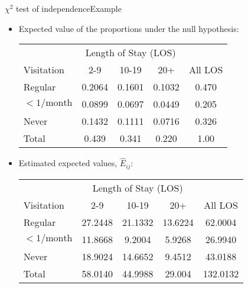 \documentclass[xcolor=dvipsnames]{beamer}
\begin{document}
\begin{frame}{$\chi^2$ test of independence}{Example}
\begin{itemize}
	\item Expected value of the proportions under the null hypothesis:
	\vspace{1mm}
	{\scriptsize
		\begin{center}
		\begin{tabular}{|l|ccc|c|}
			\hline
			& \multicolumn{3}{c|}{Length of Stay (LOS)} & \\
			Visitation & 2-9 & 10-19 & 20+ & All LOS \\ \hline
			Regular           &0.2064 &0.1601 &0.1032 & 0.470\\
			$<1/\text{month}$ &0.0899 &0.0697 &0.0449 & 0.205\\
			Never             &0.1432 &0.1111 &0.0716 & 0.326\\ \hline
			Total & 0.439 & 0.341 & 0.220 &1.00 \\ \hline
		\end{tabular}
	\end{center}}
	\vspace{1mm}
	\item Estimated expected values, $\hat{E}_{ij}$:
	\vspace{1mm}
	{\scriptsize
		\begin{center}
			\begin{tabular}{|l|ccc|c|}
				\hline
				& \multicolumn{3}{c|}{Length of Stay (LOS)} & \\
				Visitation & 2-9 & 10-19 & 20+ & All LOS \\ \hline
				Regular           &27.2448 &21.1332& 13.6224& 62.0004  \\
				$<1/\text{month}$ &11.8668 & 9.2004& 5.9268& 26.9940 \\
				Never             &18.9024 &14.6652&  9.4512& 43.0188\\ \hline
				Total & 58.0140 & 44.9988 & 29.004 & 132.0132\\ \hline
			\end{tabular}
	\end{center}}
\end{itemize}
\end{frame}
\end{document}
